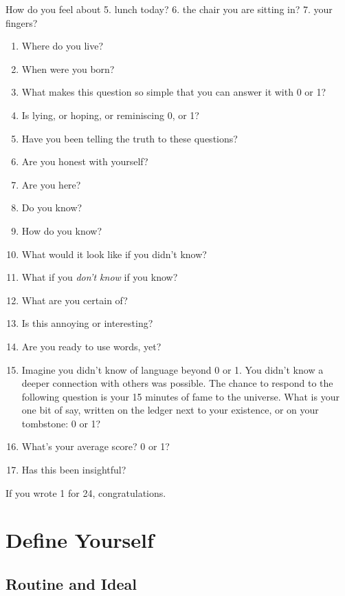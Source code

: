 \documentclass[
]{book}
\begin{document}
How do you feel about
5. lunch today?
6. the chair you are sitting in?
7. your fingers?

\begin{enumerate}
\def\labelenumi{\arabic{enumi}.}
\setcounter{enumi}{7}
\item
  Where do you live?
\item
  When were you born?
\item
  What makes this question so simple that you can answer it
  with 0 or 1?
\item
  Is lying, or hoping, or reminiscing 0, or 1?
\item
  Have you been telling the truth to these questions?
\item
  Are you honest with yourself?
\item
  Are you here?
\item
  Do you know?
\item
  How do you know?
\item
  What would it look like if you didn't know?
\item
  What if you \emph{don't know} if you know?
\item
  What are you certain of?
\item
  Is this annoying or interesting?
\item
  Are you ready to use words, yet?
\item
  Imagine you didn't know of language beyond 0 or 1.
  You didn't know a deeper connection with others was possible.
  The chance to respond to the following question is
  your 15 minutes of fame to the universe.
  What is your one bit of say,
  written on the ledger next to your existence, or
  on your tombstone: 0 or 1?
\item
  What's your average score? 0 or 1?
\item
  Has this been insightful?
\end{enumerate}

If you wrote 1 for 24, congratulations.

\chapter{Define Yourself}\label{define-yourself}

\section{Routine and Ideal}\label{routine-and-ideal}
\end{document}
